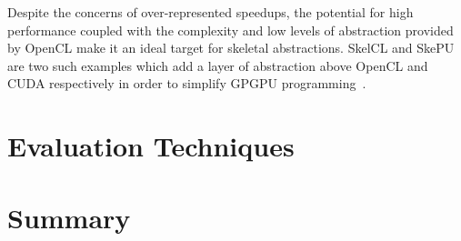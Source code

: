 Despite the concerns of over-represented speedups, the potential for high performance coupled with the complexity and low levels of abstraction provided by OpenCL make it an ideal target for skeletal abstractions. SkelCL and SkePU are two such examples which add a layer of abstraction above OpenCL and CUDA respectively in order to simplify GPGPU programming~\cite{Enmyren2010}.

\section{Evaluation Techniques}
\label{subsec:background-evaluation-techniques}

\section{Summary}
\label{subsec:background-summary}